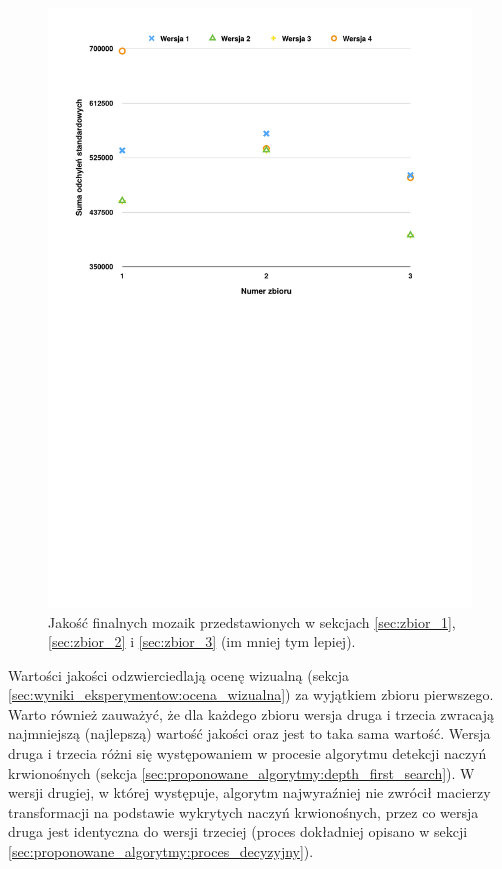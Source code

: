 \begin{figure}[htb]
  \centering
  \includegraphics[width=\textwidth]{gfx/odchylenie_standardowe}
  \caption{Jakość finalnych mozaik przedstawionych w sekcjach \ref{sec:zbior_1}, \ref{sec:zbior_2} i \ref{sec:zbior_3} (im mniej tym lepiej).}
  \label{fig:wyniki_eksperymentow:odchylenie_standardowe}
\end{figure}

Wartości jakości odzwierciedlają ocenę wizualną (sekcja \ref{sec:wyniki_eksperymentow:ocena_wizualna}) za wyjątkiem zbioru pierwszego. Warto również zauważyć, że dla każdego zbioru wersja druga i trzecia zwracają najmniejszą (najlepszą) wartość jakości oraz jest to taka sama wartość. Wersja druga i trzecia różni się występowaniem w procesie algorytmu detekcji naczyń krwionośnych (sekcja \ref{sec:proponowane_algorytmy:depth_first_search}). W wersji drugiej, w której występuje, algorytm najwyraźniej nie zwrócił macierzy transformacji na podstawie wykrytych naczyń krwionośnych, przez co wersja druga jest identyczna do wersji trzeciej (proces dokładniej opisano w sekcji \ref{sec:proponowane_algorytmy:proces_decyzyjny}).

